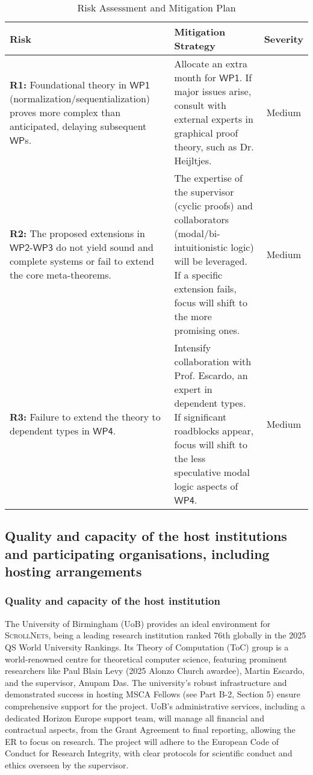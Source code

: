 \documentclass[11pt]{msca-pf}
\newcommand{\proj}{\small\textsc{ScrollNets}}
\newcommand{\WP}[1]{$\mathsf{WP#1}$}
\begin{document}
\begin{table}[h!]
\centering
\fontsize{11pt}{10pt}\selectfont
\caption{Risk Assessment and Mitigation Plan}
\begin{tabular}{p{} p{} c}
\toprule
\textbf{Risk} & \textbf{Mitigation Strategy} & \textbf{Severity} \\
\midrule
\textbf{R1:} Foundational theory in \WP{1} (normalization/sequentialization) proves more complex than anticipated, delaying subsequent $\mathsf{WP}$s. & Allocate an extra month for \WP{1}. If major issues arise, consult with external experts in graphical proof theory, such as Dr. Heijltjes. & Medium \\
\addlinespace
\textbf{R2:} The proposed extensions in \WP{2}-\WP{3} do not yield sound and complete systems or fail to extend the core meta-theorems. & The expertise of the supervisor (cyclic proofs) and collaborators (modal/bi-intuitionistic logic) will be leveraged. If a specific extension fails, focus will shift to the more promising ones. & Medium \\
\addlinespace
\textbf{R3:} Failure to extend the theory to dependent types in \WP{4}. & Intensify collaboration with Prof. Escardo, an expert in dependent types. If significant roadblocks appear, focus will shift to the less speculative modal logic aspects of \WP{4}. & Medium \\
\bottomrule
\end{tabular}
\end{table}

\subsection{Quality and capacity of the host institutions and participating
organisations, including hosting arrangements}
\label{ssc:implementation:host}

\subsubsection{Quality and capacity of the host institution}

The University of Birmingham (UoB) provides an ideal environment for {\proj}, being a leading
research institution ranked 76th globally in the 2025 QS World University Rankings. Its Theory of
Computation (ToC) group is a world-renowned centre for theoretical computer science, featuring
prominent researchers like Paul Blain Levy (2025 Alonzo Church awardee), Martin Escardo, and the
supervisor, Anupam Das. The university's robust infrastructure and demonstrated success in hosting
MSCA Fellows (see Part B-2, Section 5) ensure comprehensive support for the project. UoB's
administrative services, including a dedicated Horizon Europe support team, will manage all
financial and contractual aspects, from the Grant Agreement to final reporting, allowing the ER to
focus on research. The project will adhere to the European Code of Conduct for Research Integrity,
with clear protocols for scientific conduct and ethics overseen by the supervisor.
\end{document}
